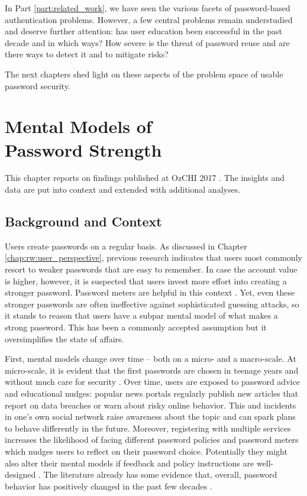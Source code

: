 In Part \ref{part:related_work}, we have seen the various facets of password-based authentication problems. However, a few central problems remain understudied and deserve further attention: has user education been successful in the past decade and in which ways? How severe is the threat of password reuse and are there ways to detect it and to mitigate risks? 

The next chapters shed light on these aspects of the problem space of usable password security. 

\chapter[Mental Models of Password Strength]{Mental Models of \\
	Password Strength}\label{chap:pasdjo}

This chapter reports on findings published at OzCHI 2017 \cite{Seitz2017PASDJO}. The insights and data are put into context and extended with additional analyses. 

\section{Background and Context}
Users create passwords on a regular basis. As discussed in Chapter \ref{chap:rw:user_perspective}, previous research indicates that users most commonly resort to weaker passwords that are easy to remember. In case the account value is higher, however, it is suspected that users invest more effort into creating a stronger password. Password meters are helpful in this context \cite{Egelman2013DoesMyPasswordGoUpToEleven}. Yet, even these stronger passwords are often ineffective against sophisticated guessing attacks, so it stands to reason that users have a subpar mental model of what makes a strong password. This has been a commonly accepted assumption \ar but it oversimplifies the state of affairs. 

First, mental models change over time -- both on a micro- and a macro-scale. At micro-scale, it is evident that the first passwords are chosen in teenage years and without much care for security \cite{VonZezschwitz2013SurvivalShortest}. Over time, users are exposed to password advice and educational nudges: popular news portals regularly publish new articles that report on data breaches or warn about risky online behavior. This and incidents in one's own social network \cite{Stobert2014PasswordLifeCycle} raise awareness about the topic and can spark plans to behave differently in the future. Moreover, registering with multiple services increases the likelihood of facing different password policies and password meters which nudges users to reflect on their password choice. Potentially they might also alter their mental models if feedback and policy instructions are well-designed \cite{Shay2015SpoonfulOfSugar, Ur2017DataDrivenPWMeter}. The literature already has some evidence that, overall, password behavior has positively changed in the past few decades \cite{Riley2006WhatUsersKnowWhatTheyDo, Schneier2006RealWorldPasswords}. 

